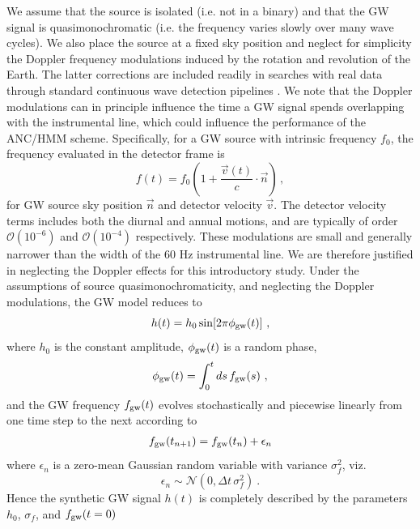 \documentclass[pra,superscriptaddress,reprint,amsmath,amssymb,nofootinbib]{revtex4-2}
\begin{document}
We assume that the source is isolated (i.e. not in a binary) and that the GW signal is quasimonochromatic (i.e. the frequency varies slowly over many wave cycles). We also place the source at a fixed sky position and neglect for simplicity the Doppler frequency modulations induced by the rotation and revolution of the Earth. The latter corrections are included readily in searches with real data through standard continuous wave detection pipelines \cite{Suvorova2016PhRv,2022PhRvD.106j2008A}. We note that the Doppler modulations can in principle influence the time a GW signal spends overlapping with the instrumental line, which could influence the performance of the ANC/HMM scheme. Specifically, for a GW source with intrinsic frequency $f_0$, the frequency evaluated in the detector frame is 
\begin{equation}
	f(t) = f_0 \left(1 + \frac{\vec{v}(t)}{c} \cdot \vec{n}\right) \, ,
\end{equation}
for GW source sky position $\vec{n}$ and detector velocity $\vec{v}$. The detector velocity terms includes both the diurnal and annual motions, and are typically of order $\mathcal{O} \left(10^{-6}\right)$ and $\mathcal{O} \left(10^{-4}\right)$ respectively. These modulations are small and generally narrower than the width of the 60 Hz instrumental line. We are therefore justified in neglecting the Doppler effects for this introductory study. Under the assumptions of source quasimonochromaticity, and neglecting the Doppler modulations, the GW model reduces to 
\begin{equation}
	h(t) = h_0\sin[2\pi \phi_{\rm gw}(t)] \ , \label{eq:ht}
\end{equation}
where $h_0$ is the constant amplitude, $\phi_{\rm gw}(t)$ is a random phase,
\begin{equation}
	\phi_{\rm gw}(t) = \int_{0}^{t} ds \, f_{\rm gw}(s)  \ ,
\end{equation}
and the GW frequency $f_{\rm gw}(t)$ evolves stochastically and piecewise linearly from one time step to the next according to
\begin{eqnarray}
	f_{\rm gw}(t_{n+1}) = f_{\rm gw}(t_n) + \epsilon_n 
\end{eqnarray}
where $\epsilon_n$ is a zero-mean Gaussian random variable with variance $\sigma_f^2$, viz.
\begin{equation}
	\epsilon_n \sim \mathcal{N}(0, \Delta t  \, \sigma_f^2) \ . \label{eq:gwfreqnoise}
\end{equation}
Hence the synthetic GW signal $h(t)$ is completely described by the parameters $h_0$, $\sigma_f$, and $f_{\rm gw}(t=0)$ \newline 
\end{document}
